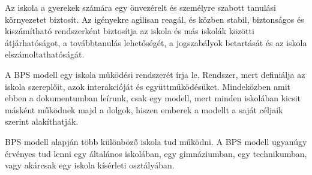 Az iskola a gyerekek számára egy önvezérelt és személyre szabott
tanulási környezetet biztosít. Az igényekre agilisan reagál, és közben
stabil, biztonságos és kiszámítható rendszerként biztosítja az iskola és
más iskolák közötti átjárhatóságot, a továbbtanulás lehetőségét, a
jogszabályok betartását és az iskola elszámoltathatóságát.

A BPS modell egy iskola működési rendszerét írja le. Rendszer, mert
definiálja az iskola szereplőit, azok interakcióját és
együttműködésüket. Mindeközben amit ebben a dokumentumban leírunk, csak
egy modell, mert minden iskolában kicsit másként működnek majd a dolgok,
hiszen emberek a modellt a saját céljaik szerint alakíthatják.

BPS modell alapján több különböző iskola tud működni. A BPS modell
ugyanúgy érvényes tud lenni egy általános iskolában, egy gimnáziumban,
egy technikumban, vagy akárcsak egy iskola kísérleti osztályában.
